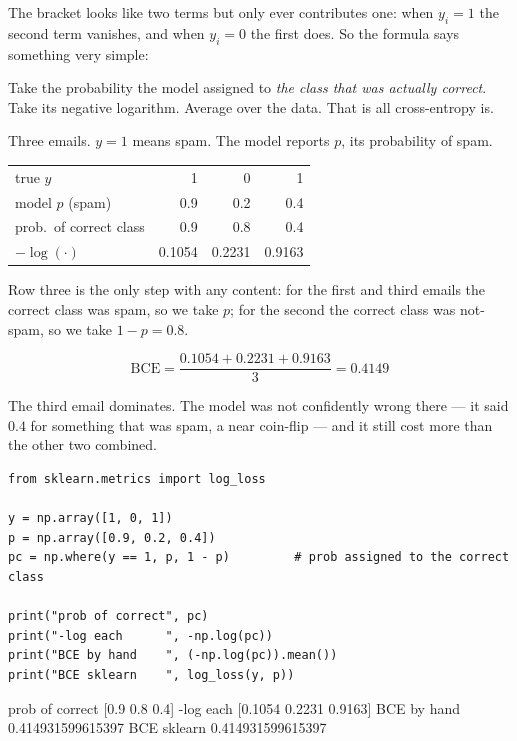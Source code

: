 \documentclass[11pt]{article}
\begin{document}
The bracket looks like two terms but only ever contributes one: when $y_i=1$
the second term vanishes, and when $y_i=0$ the first does. So the formula says
something very simple:

\begin{keyidea}
Take the probability the model assigned to \emph{the class that was actually
correct}. Take its negative logarithm. Average over the data. That is all
cross-entropy is.
\end{keyidea}

\begin{worked}
Three emails. $y=1$ means spam. The model reports $p$, its probability of spam.

\begin{center}
\begin{tabular}{@{}lrrr@{}}
\toprule
true $y$              & 1   & 0   & 1\\
model $p$ (spam)      & 0.9 & 0.2 & 0.4\\
\midrule
prob.\ of correct class & 0.9 & 0.8 & 0.4\\
$-\log(\cdot)$          & 0.1054 & 0.2231 & 0.9163\\
\bottomrule
\end{tabular}
\end{center}

Row three is the only step with any content: for the first and third emails the
correct class was spam, so we take $p$; for the second the correct class was
not-spam, so we take $1-p = 0.8$.

\[
  \mathrm{BCE} = \frac{0.1054 + 0.2231 + 0.9163}{3} = \mathbf{0.4149}
\]

The third email dominates. The model was not confidently wrong there --- it said
$0.4$ for something that was spam, a near coin-flip --- and it still cost more
than the other two combined.
\end{worked}

\begin{lstlisting}
from sklearn.metrics import log_loss

y = np.array([1, 0, 1])
p = np.array([0.9, 0.2, 0.4])
pc = np.where(y == 1, p, 1 - p)         # prob assigned to the correct class

print("prob of correct", pc)
print("-log each      ", -np.log(pc))
print("BCE by hand    ", (-np.log(pc)).mean())
print("BCE sklearn    ", log_loss(y, p))
\end{lstlisting}
\begin{codeout}
prob of correct [0.9 0.8 0.4]
-log each       [0.1054 0.2231 0.9163]
BCE by hand     0.414931599615397
BCE sklearn     0.414931599615397
\end{codeout}
\end{document}
